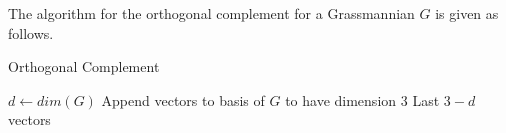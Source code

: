 \documentclass[12pt]{article}
\newenvironment{proposition}[2][Proposition]{\begin{trivlist}
\item[\hskip \labelsep {\bfseries #1}\hskip \labelsep {\bfseries #2.}]}{\end{trivlist}}
\begin{document}
\begin{proposition}{4.2}
The algorithm for the orthogonal complement for a Grassmannian \(G\) is given as follows.

\begin{algorithm}[H]
\caption{Orthogonal Complement}
\begin{algorithmic}[5]
\State $d \gets dim(G)$
\State Append vectors to basis of $G$ to have dimension 3
\Return Last $3-d$ vectors
\EndProcedure
\end{algorithmic}
\end{algorithm}

\end{proposition}
\end{document}
